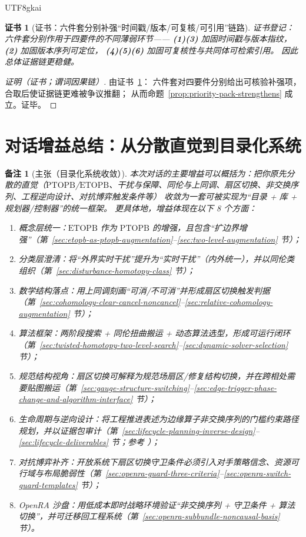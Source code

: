 \documentclass[12pt]{article}
\newtheorem{remark}{备注}[section]
\newtheorem{Certificate}{证书}[section]
\newcommand{\PTOPB}{\ensuremath{\mathrm{PTOPB}}}
\newcommand{\ETOPB}{\ensuremath{\mathrm{ETOPB}}}
\begin{document}
\begin{CJK*}{UTF8}{gkai}
\begin{Certificate}[证书：六件套分别补强“时间戳/版本/可复核/可引用”链路]
\label{cert:priority-pack-strengthens}
证书登记：六件套分别作用于四要件的不同薄弱环节——
\textbf{(1)(3)} 加固时间戳与版本指纹，
\textbf{(2)} 加固版本序列可定位，
\textbf{(4)(5)(6)} 加固可复核性与共同体可检索引用。
因此总体证据链更稳健。
\end{Certificate}

\begin{proof}[证明（证书；谓词因果链）]
由证书~\ref{cert:priority-pack-strengthens}：
六件套对四要件分别给出可核验补强项，合取后使证据链更难被争议推翻；
从而命题~\ref{prop:priority-pack-strengthens} 成立。证毕。
\end{proof}

\section{对话增益总结：从分散直觉到目录化系统}
\label{sec:dialogue-gains-summary}

\begin{remark}[主张（目录化系统收敛）]
本次对话的主要增益可以概括为：把你原先分散的直觉（\PTOPB/\ETOPB、干扰与保障、同伦与上同调、扇区切换、非交换序列、工程逆向设计、对抗博弈触发条件等）
收敛为一套可被实现为“目录 + 库 + 规划器/控制器”的统一框架。
更具体地，增益体现在以下 8 个方面：
\begin{enumerate}
  \item 概念层统一：\ETOPB{} 作为 \PTOPB{} 的增强，且包含“扩边界增强”（第~\ref{sec:etopb-as-ptopb-augmentation}--\ref{sec:two-level-augmentation} 节）；
  \item 分类层澄清：将“外界实时干扰”提升为“实时干扰”（内外统一），并以同伦类组织（第~\ref{sec:disturbance-homotopy-class} 节）；
  \item 数学结构落点：用上同调刻画“可消/不可消”并形成扇区切换触发判据（第~\ref{sec:cohomology-clear-cancel-noncancel}--\ref{sec:relative-cohomology-augmentation} 节）；
  \item 算法框架：两阶段搜索 + 同伦扭曲搬运 + 动态算法选型，形成可运行闭环（第~\ref{sec:twisted-homotopy-two-level-search}--\ref{sec:dynamic-solver-selection} 节）；
  \item 规范结构视角：扇区切换可解释为规范场扇区/修复结构切换，并在跨相处需要贴图搬运（第~\ref{sec:gauge-structure-switching}--\ref{sec:edge-trigger-phase-change-and-algorithm-interface} 节）；
  \item 生命周期与逆向设计：将工程推进表述为边缘算子非交换序列的门槛约束路径规划，并以证据包审计（第~\ref{sec:lifecycle-planning-inverse-design}--\ref{sec:lifecycle-deliverables} 节；参考 \cite{ref_nasa_trl,ref_stage_gate_dtl}）；
  \item 对抗博弈补齐：开放系统下扇区切换守卫条件必须引入对手策略信念、资源可行域与布局脆弱性（第~\ref{sec:openra-guard-three-criteria}--\ref{sec:openra-switch-guard-templates} 节）；
  \item OpenRA 沙盘：用低成本即时战略环境验证“非交换序列 + 守卫条件 + 算法切换”，并可迁移回工程系统（第~\ref{sec:openra-subbundle-noncausal-basis} 节）。
\end{enumerate}
\end{remark}


\end{CJK*}
\end{document}
